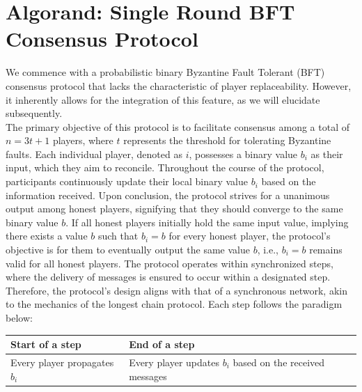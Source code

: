\section{Algorand: Single Round BFT Consensus Protocol}
We commence with a probabilistic binary Byzantine Fault Tolerant (BFT) consensus protocol that lacks the characteristic of player replaceability. However, it inherently allows for the integration of this feature, as we will elucidate subsequently.\\
The primary objective of this protocol is to facilitate consensus among a total of $n = 3t + 1$ players, where $t$ represents the threshold for tolerating Byzantine faults. Each individual player, denoted as $i$, possesses a binary value $b_{i}$ as their input, which they aim to reconcile. Throughout the course of the protocol, participants continuously update their local binary value $b_{i}$ based on the information received. Upon conclusion, the protocol strives for a unanimous output among honest players, signifying that they should converge to the same binary value $b$. If all honest players initially hold the same input value, implying there exists a value $b$ such that $b_{i} = b$ for every honest player, the protocol's objective is for them to eventually output the same value $b$, i.e., $b_{i} = b$ remains valid for all honest players.
The protocol operates within synchronized steps, where the delivery of messages is ensured to occur within a designated step. Therefore, the protocol's design aligns with that of a synchronous network, akin to the mechanics of the longest chain protocol. Each step follows the paradigm below:\\
\begin{table}[htbp]
	\centering
	\begin{tabular}{|>{\centering\arraybackslash}p{4cm}|>{\centering\arraybackslash}p{8cm}|}
		\hline
		Start of a step & End of a step\\
		\hline
		Every player propagates $b_{i}$ & Every player updates $b_{i}$ based on the received messages\\
		\hline
	\end{tabular}
\end{table}
